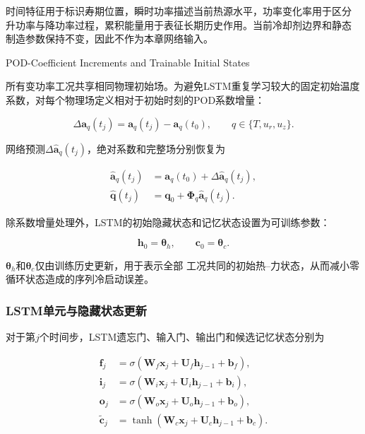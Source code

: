 时间特征用于标识寿期位置，瞬时功率描述当前热源水平，功率变化率用于区分
升功率与降功率过程，累积能量用于表征长期历史作用。当前冷却剂边界和静态
制造参数保持不变，因此不作为本章网络输入。

{POD-Coefficient Increments and Trainable Initial States}

所有变功率工况共享相同物理初始场。为避免LSTM重复学习较大的固定初始温度
系数，对每个物理场定义相对于初始时刻的POD系数增量：

\begin{equation}
	\Delta\boldsymbol a_q(t_j)
	=
	\boldsymbol a_q(t_j)-\boldsymbol a_q(t_0),
	\qquad
	q\in\{T,u_r,u_z\}.
	\label{eq:formal_coefficient_increment}
\end{equation}

网络预测$\Delta\widehat{\boldsymbol a}_q(t_j)$，绝对系数和完整场分别恢复为

\begin{align}
	\widehat{\boldsymbol a}_q(t_j)
	&=
	\boldsymbol a_q(t_0)
	+
	\Delta\widehat{\boldsymbol a}_q(t_j),
	\label{eq:formal_restore_coefficients}\\
	\widehat{\boldsymbol q}(t_j)
	&=
	\boldsymbol q_0
	+
	\boldsymbol\Phi_q
	\widehat{\boldsymbol a}_q(t_j).
	\label{eq:formal_restore_field}
\end{align}

除系数增量处理外，LSTM的初始隐藏状态和记忆状态设置为可训练参数：

\begin{equation}
	\boldsymbol h_0=\boldsymbol\theta_h,
	\qquad
	\boldsymbol c_0=\boldsymbol\theta_c.
	\label{eq:trainable_lstm_initial_states}
\end{equation}

$\boldsymbol\theta_h$和$\boldsymbol\theta_c$仅由训练历史更新，用于表示全部
工况共同的初始热--力状态，从而减小零循环状态造成的序列冷启动误差。

\subsubsection{LSTM单元与隐藏状态更新}

对于第$j$个时间步，LSTM遗忘门、输入门、输出门和候选记忆状态分别为

\begin{align}
	\boldsymbol{f}_j
	&=\sigma\left(
	\boldsymbol{W}_f\boldsymbol{x}_j
	+\boldsymbol{U}_f\boldsymbol{h}_{j-1}
	+\boldsymbol{b}_f\right),
	\label{eq:lstm_forget_gate}\\
	\boldsymbol{i}_j
	&=\sigma\left(
	\boldsymbol{W}_i\boldsymbol{x}_j
	+\boldsymbol{U}_i\boldsymbol{h}_{j-1}
	+\boldsymbol{b}_i\right),
	\label{eq:lstm_input_gate}\\
	\boldsymbol{o}_j
	&=\sigma\left(
	\boldsymbol{W}_o\boldsymbol{x}_j
	+\boldsymbol{U}_o\boldsymbol{h}_{j-1}
	+\boldsymbol{b}_o\right),
	\label{eq:lstm_output_gate}\\
	\widetilde{\boldsymbol{c}}_j
	&=\tanh\left(
	\boldsymbol{W}_c\boldsymbol{x}_j
	+\boldsymbol{U}_c\boldsymbol{h}_{j-1}
	+\boldsymbol{b}_c\right).
	\label{eq:lstm_candidate_state}
\end{align}


